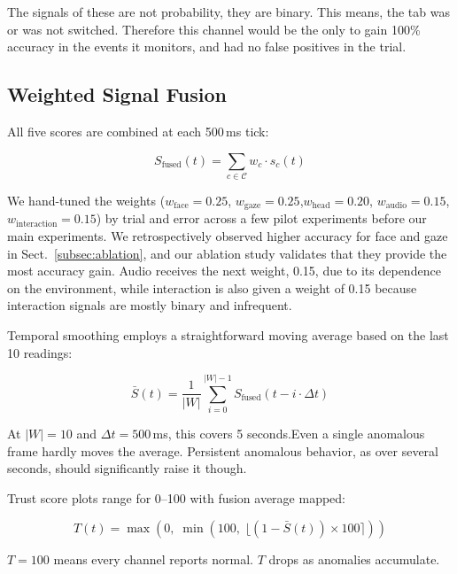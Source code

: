 \documentclass[runningheads]{llncs}
\begin{document}
The signals of these are not probability, they are binary. This means, the tab was or was not switched. Therefore this channel would be the only to gain 100\% accuracy in the events it monitors, and had no false positives in the trial.

\subsection{Weighted Signal Fusion}

All five scores are combined at each 500\,ms tick:

\begin{equation}
    S_{\text{fused}}(t) = \sum_{c \in \mathcal{C}} w_c \cdot s_c(t)
    \label{eq:fusion}
\end{equation}

We hand-tuned the weights ($w_{\text{face}} = 0.25$, $w_{\text{gaze}} = 0.25$,$w_{\text{head}} = 0.20$, $w_{\text{audio}} = 0.15$,$w_{\text{interaction}} = 0.15$) by trial and error across a few pilot
experiments before our main experiments. We retrospectively observed higher
accuracy for face and gaze in Sect.~\ref{subsec:ablation}, and our ablation study validates
that they provide the most accuracy gain. Audio receives the next weight,
0.15, due to its dependence on the environment, while interaction is also
given a weight of 0.15 because interaction signals are mostly binary and
infrequent.

Temporal smoothing employs a straightforward moving average based on the last 10 readings:

\begin{equation}
    \bar{S}(t) = \frac{1}{|W|}\sum_{i=0}^{|W|-1} S_{\text{fused}}(t - i \cdot \Delta t)
    \label{eq:smoothing}
\end{equation}

At $|W| = 10$ and $\Delta t = 500$\,ms, this covers 5 seconds.Even a single anomalous frame hardly moves the average. Persistent anomalous behavior, as over several seconds, should significantly raise it though.

Trust score plots range for 0--100 with fusion average mapped:

\begin{equation}
    T(t) = \max\left(0, \; \min\left(100, \; \lfloor(1 - \bar{S}(t)) \times 100\rceil\right)\right)
    \label{eq:trust}
\end{equation}

$T = 100$ means every channel reports normal. $T$ drops as anomalies accumulate.
\end{document}
